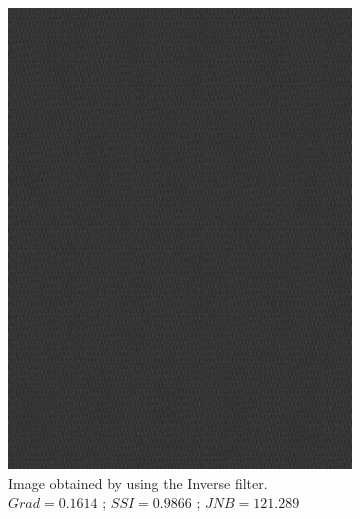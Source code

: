 \begin{figure}[H]
        \centering
        \begin{subfigure}[b]{0.35\textwidth}
                \centering
                \includegraphics[width=\textwidth]{memchu_inv_noise.jpg}
                \caption{Image obtained by using the Inverse filter.\newline $Grad=0.1614$ ; $SSI=0.9866$ ; $JNB=121.289$}
        \end{subfigure}
        \hspace{1.5cm}
        \begin{subfigure}[b]{0.35\textwidth}
                 \centering

\end{subfigure}
\end{figure}
